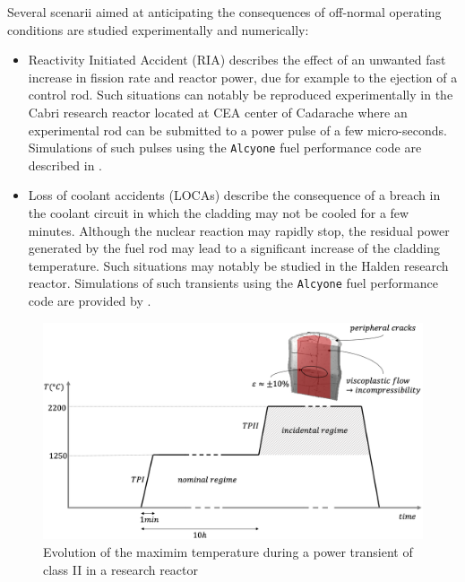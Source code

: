 Several scenarii aimed at anticipating the consequences of off-normal
operating conditions are studied experimentally and numerically:

\begin{itemize}
  \item Reactivity Initiated Accident (RIA) describes the effect of an
  unwanted fast increase in fission rate and reactor power, due for
  example to the ejection of a control rod. Such situations can notably
  be reproduced experimentally in the Cabri research reactor located at
  CEA center of Cadarache where an experimental rod can be submitted to
  a power pulse of a few micro-seconds. Simulations of such pulses using
  the \texttt{Alcyone} fuel performance code are described in
  \cite{guenot-delahaie_simulation_2017}.
  \item Loss of coolant accidents (LOCAs) describe the consequence of a
  breach in the coolant circuit in which the cladding may not be cooled
  for a few minutes. Although the nuclear reaction may rapidly stop, the
  residual power generated by the fuel rod may lead to a significant
  increase of the cladding temperature. Such situations may notably be
  studied in the Halden research reactor. Simulations of such transients
  using the \texttt{Alcyone} fuel performance code are provided by
  \cite{struzik_simulation_2017}.
\end{itemize}


\begin{figure}[H]
  \centering
  \includegraphics[width=10.cm]{../chapter_00_introduction/figures/TransientPowerClassII.png}
  \caption{Evolution of the maximim temperature during a power transient of class II in a research reactor}
  \label{fig:hho:transient_power}
\end{figure}

